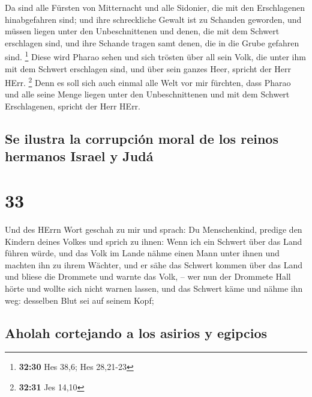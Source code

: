  Da sind alle Fürsten von Mitternacht und alle Sidonier,
die mit den Erschlagenen hinabgefahren sind; und ihre schreckliche
Gewalt ist zu Schanden geworden, und müssen liegen unter den
Unbeschnittenen und denen, die mit dem Schwert erschlagen sind, und ihre
Schande tragen samt denen, die in die Grube gefahren sind. \footnote{\textbf{32:30}
  Hes 38,6; Hes 28,21-23}  Diese wird Pharao sehen und
sich trösten über all sein Volk, die unter ihm mit dem Schwert
erschlagen sind, und über sein ganzes Heer, spricht der Herr HErr.
\footnote{\textbf{32:31} Jes 14,10}  Denn es soll sich
auch einmal alle Welt vor mir fürchten, dass Pharao und alle seine Menge
liegen unter den Unbeschnittenen und mit dem Schwert Erschlagenen,
spricht der Herr HErr.

\hypertarget{se-ilustra-la-corrupciuxf3n-moral-de-los-reinos-hermanos-israel-y-juduxe1}{%
\subsection{Se ilustra la corrupción moral de los reinos hermanos Israel
y
Judá}\label{se-ilustra-la-corrupciuxf3n-moral-de-los-reinos-hermanos-israel-y-juduxe1}}

\hypertarget{section-32}{%
\section{33}\label{section-32}}

 Und des HErrn Wort geschah zu mir und sprach:
 Du Menschenkind, predige den Kindern deines Volkes und
sprich zu ihnen: Wenn ich ein Schwert über das Land führen würde, und
das Volk im Lande nähme einen Mann unter ihnen und machten ihn zu ihrem
Wächter,  und er sähe das Schwert kommen über das Land und
bliese die Drommete und warnte das Volk, --  wer nun der
Drommete Hall hörte und wollte sich nicht warnen lassen, und das Schwert
käme und nähme ihn weg: desselben Blut sei auf seinem Kopf;

\hypertarget{aholah-cortejando-a-los-asirios-y-egipcios}{%
\subsection{Aholah cortejando a los asirios y
egipcios}\label{aholah-cortejando-a-los-asirios-y-egipcios}}

